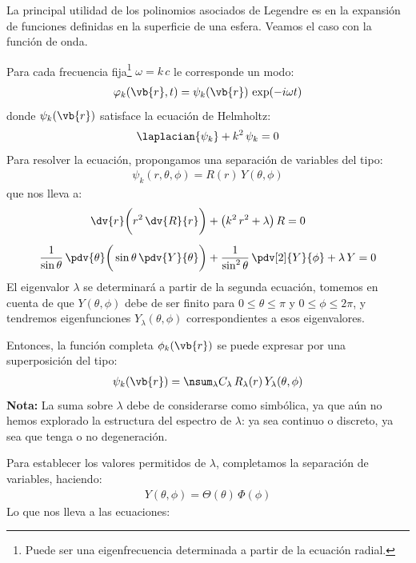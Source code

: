 La principal utilidad de los polinomios asociados de Legendre es en la expansión de funciones definidas en la superficie de una esfera. Veamos el caso con la función de onda.
\par
Para cada frecuencia fija\footnote{Puede ser una eigenfrecuencia determinada a partir de la ecuación radial.} $\omega = k \, c$ le corresponde un modo:
\begin{align*}
\varphi_{k} (\vb{r}, t) = \psi_{k} (\vb{r}) \, \exp(- i \omega t)
\end{align*}
donde $\psi_{k} (\vb{r})$ satisface la ecuación de Helmholtz:
\begin{align*}
\laplacian{\psi_{k}} + k^{2} \, \psi_{k} = 0
\end{align*}
Para resolver la ecuación, propongamos una separación de variables del tipo:
\begin{align*}
\psi_{k} (r, \theta, \phi) = R (r) \, Y (\theta, \phi)
\end{align*}
que nos lleva a:
\begin{align*}
\dv{r} \bigg( r^{2} \, \dv{R}{r} \bigg) &+ \big( k^{2} \, r^{2} + \lambda \big) \, R = 0 \\[0.5em]
\dfrac{1}{\sin \theta} \, \pdv{\theta} \bigg( \sin \theta \, \pdv{Y}{\theta} \bigg) &+ \dfrac{1}{\sin^{2} \theta} \, \pdv[2]{Y}{\phi} + \lambda \, Y = 0
\end{align*}
El eigenvalor $\lambda$ se determinará a partir de la segunda ecuación, tomemos en cuenta de que $Y (\theta, \phi)$ debe de ser finito para $0 \leq \theta \leq \pi$ y $0 \leq \phi \leq 2 \pi$, y tendremos eigenfunciones $Y_{\lambda} (\theta, \phi)$ correspondientes a esos eigenvalores.
\par
Entonces, la función completa $\phi_{k} (\vb{r})$ se puede expresar por una superposición del tipo:
\begin{align*}
\psi_{k} (\vb{r}) = \nsum_{\lambda} C_{\lambda} \, R_{\lambda} (r) \, Y_{\lambda} (\theta, \phi)
\end{align*}
\textbf{Nota: } La suma sobre $\lambda$ debe de considerarse como simbólica, ya que aún no hemos explorado la estructura del espectro de $\lambda$: ya sea continuo o discreto, ya sea que tenga o no degeneración.
\par
Para establecer los valores permitidos de $\lambda$, completamos la separación de variables, haciendo:
\begin{align*}
Y (\theta, \phi) = \Theta (\theta) \, \Phi (\phi)
\end{align*}
Lo que nos lleva a las ecuaciones:
